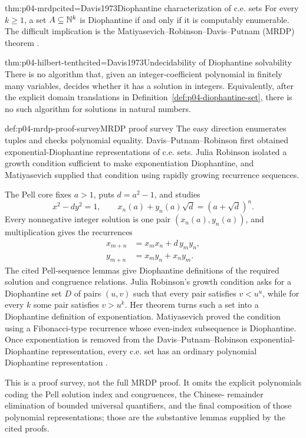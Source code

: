 \begin{hbtheorem}{thm:p04-mrdp}{cited=Davis1973}{Diophantine characterization of c.e. sets}
For every \(k\geq1\), a set \(A\subseteq\mathbb{N}^k\) is Diophantine if and only if
it is computably enumerable.  The difficult implication is the
Matiyasevich--Robinson--Davis--Putnam (MRDP) theorem
\cite{DavisPutnamRobinson1961,Matiyasevich1970}.
\end{hbtheorem}

\begin{hbcorollary}{thm:p04-hilbert-tenth}{cited=Davis1973}{Undecidability of Diophantine solvability}
There is no algorithm that, given an integer-coefficient polynomial in
finitely many variables, decides whether it has a solution in integers.
Equivalently, after the explicit domain translations in
Definition~\ref{def:p04-diophantine-set}, there is no such algorithm for
solutions in natural numbers.
\end{hbcorollary}

\begin{hbmethod}{def:p04-mrdp-proof-survey}{MRDP proof survey}
The easy direction enumerates tuples and checks polynomial equality.
Davis--Putnam--Robinson first obtained exponential-Diophantine
representations of c.e. sets.  Julia Robinson isolated a growth condition
sufficient to make exponentiation Diophantine, and Matiyasevich supplied that
condition using rapidly growing recurrence sequences.

The Pell core fixes \(a>1\), puts \(d=a^2-1\), and studies
\[
 x^2-dy^2=1,
 \qquad
 x_n(a)+y_n(a)\sqrt d=(a+\sqrt d)^n.
\]
Every nonnegative integer solution is one pair
\((x_n(a),y_n(a))\), and multiplication gives the recurrences
\[
\begin{aligned}
 x_{m+n}&=x_mx_n+d\,y_my_n,\\
 y_{m+n}&=x_my_n+x_ny_m.
\end{aligned}
\]
The cited Pell-sequence lemmas give Diophantine definitions of the required
solution and congruence relations.  Julia Robinson's growth condition asks for
a Diophantine set \(D\) of pairs \((u,v)\) such that every pair satisfies
\(v<u^u\), while for every \(k\) some pair satisfies \(v>u^k\).  Her theorem
turns such a set into a Diophantine definition of exponentiation.
Matiyasevich proved the condition using a Fibonacci-type recurrence whose
even-index subsequence is Diophantine.  Once exponentiation is removed from
the Davis--Putnam--Robinson exponential-Diophantine representation, every
c.e. set has an ordinary polynomial Diophantine representation
\cite{DavisPutnamRobinson1961,Matiyasevich1970,Davis1973}.

This is a proof survey, not the full MRDP proof.  It omits the explicit
polynomials coding the Pell solution index and congruences, the Chinese-
remainder elimination of bounded universal quantifiers, and the final
composition of those polynomial representations; those are the substantive
lemmas supplied by the cited proofs.
\end{hbmethod}

